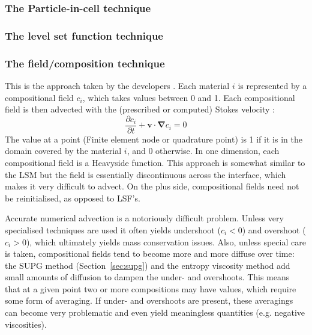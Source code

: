 \subsubsection{The Particle-in-cell technique}\label{ss:pic}



\subsubsection{The level set function technique}



\subsubsection{The field/composition technique \label{sec:compfield}}

This is the approach taken by the \aspect{} developers \cite{krhb12,hedg17}. 
Each material $i$ is represented by a compositional field $c_i$, 
which takes values between 0 and 1.
Each compositional field is then advected with the (prescribed or computed) Stokes velocity \cite{chri92}:
\begin{equation}
\frac{\partial c_i}{\partial t} + {\bm v}\cdot {\bm \nabla }c_i = 0
\end{equation}
The value at a point (Finite element node or quadrature point) is 1 if it is in the 
domain covered by the material $i$, and 0 otherwise.
In one dimension, each compositional field is a Heavyside function. 
This approach is somewhat similar to the LSM but the field is essentially 
discontinuous across the interface, which makes it very difficult to advect.  
On the plus side, compositional fields need not be reinitialised, as opposed to LSF's.

Accurate numerical advection is a notoriously difficult problem. Unless very specialised 
techniques are used it often yields undershoot ($c_i<0$) and overshoot ($c_i>0$), which 
ultimately yields mass conservation issues. Also, unless special care is taken, 
compositional fields tend to become more and more diffuse over time: the SUPG method (Section~\ref{sec:supg})
and the entropy viscosity method \cite{krhb12,ropu19} add small amounts of diffusion to dampen the under- and 
overshoots. This means that at a given point two or more compositions may have values, 
which require some form of averaging. If under- and overshoots are present, these averagings
can become very problematic and even yield meaningless quantities (e.g. negative viscosities).

